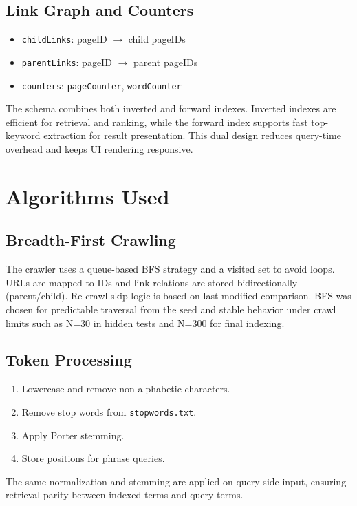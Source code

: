 \documentclass[11pt,a4paper]{article}
\begin{document}
\subsection{Link Graph and Counters}
\begin{itemize}[leftmargin=1.5em]
  \item \texttt{childLinks}: pageID $\rightarrow$ child pageIDs
  \item \texttt{parentLinks}: pageID $\rightarrow$ parent pageIDs
  \item \texttt{counters}: \texttt{pageCounter}, \texttt{wordCounter}
\end{itemize}
The schema combines both inverted and forward indexes. Inverted indexes are efficient for
retrieval and ranking, while the forward index supports fast top-keyword extraction for result
presentation. This dual design reduces query-time overhead and keeps UI rendering responsive.

\section{Algorithms Used}

\subsection{Breadth-First Crawling}
The crawler uses a queue-based BFS strategy and a visited set to avoid loops. URLs are mapped to IDs and link relations are stored bidirectionally (parent/child). Re-crawl skip logic is based on last-modified comparison.
BFS was chosen for predictable traversal from the seed and stable behavior under crawl limits
such as N=30 in hidden tests and N=300 for final indexing.

\subsection{Token Processing}
\begin{enumerate}[leftmargin=1.5em]
  \item Lowercase and remove non-alphabetic characters.
  \item Remove stop words from \texttt{stopwords.txt}.
  \item Apply Porter stemming.
  \item Store positions for phrase queries.
\end{enumerate}
The same normalization and stemming are applied on query-side input, ensuring retrieval parity
between indexed terms and query terms.
\end{document}
